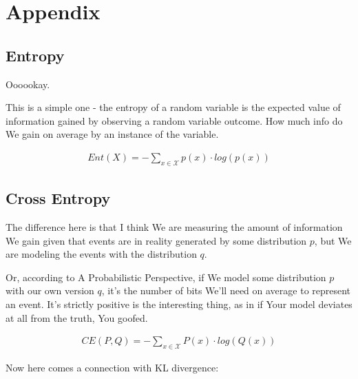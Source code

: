 \documentclass{article}
\begin{document}
		
		
		
		
		
		
		
		
		
		
		
		
		
		
		
		
		
		
		
		
		
		

\newpage\phantom{a}
\newpage		
\section{Appendix}

	\subsection{Entropy}
	
		Oooookay.
		
		This is a simple one - the entropy of a random variable is the expected value of information gained by observing a random variable outcome. How much info do We gain on average by an instance of the variable.
		
		\begin{align}
			Ent(X) = -\sum_{x\in\mathcal{X}} p(x)\cdot log(p(x))
		\end{align}
		
	\subsection{Cross Entropy}
	
		The difference here is that I think We are measuring the amount of information We gain given that events are in reality generated by some distribution $p$, but We are modeling the events with the distribution $q$.
		
		Or, according to A Probabilistic Perspective, if We model some distribution $p$ with our own version $q$, it's the number of bits We'll need on average to represent an event. It's strictly positive is the interesting thing, as in if Your model deviates at all from the truth, You goofed.
		
		\begin{align}
			CE(P, Q) = -\sum_{x\in\mathcal{X}} P(x)\cdot log(Q(x))
		\end{align}
		
		Now here comes a connection with KL divergence:
		
\end{document}
